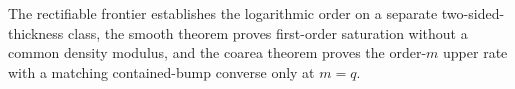 The rectifiable frontier establishes the logarithmic order on a separate two-sided-thickness class, the smooth theorem proves first-order saturation without a common density modulus, and the coarea theorem proves the order-\(m\) upper rate with a matching contained-bump converse only at \(m=q\).
